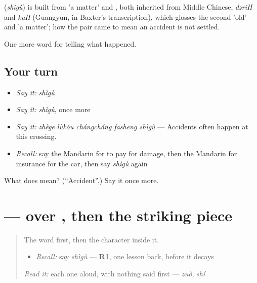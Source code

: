 \begin{cousinweb}
\textbf{} (\emph{shìgù}) is built from  'a matter' and , both inherited from Middle Chinese, \emph{dzriH} and \emph{kuH} (Guangyun, in Baxter's transcription), which glosses the second 'old' and 'a matter'; how the pair came to mean an accident is not settled.
\end{cousinweb}

\begin{grammarlens}[title={What you've built}]
One more word for telling what happened.
\end{grammarlens}

\subsection*{Your turn}
\begin{itemize}
\raggedright
  \item \emph{Say it:} \emph{shìgù}
  \item \emph{Say it:} \emph{shìgù}, once more
  \item \emph{Say it:} \emph{zhège lùkǒu chángcháng fāshēng shìgù} — Accidents often happen at this crossing.
  \item \emph{Recall:} say the Mandarin for to pay for damage, then the Mandarin for insurance for the car, then say \emph{shìgù} again
\end{itemize}

\begin{tcolorbox}[breakable,colback=teal!4,colframe=teal!35!black,title={Before you move on}]
What does  mean? (\textquotedblleft{}Accident\textquotedblright{}.) Say it once more.
\end{tcolorbox}
\section[\texorpdfstring{\zh{故} (gù)}{故 (gù)}]{ —  over , then the striking piece}

\label{lesson:ZH-W297-gu-old}



\begin{quote}
The word first, then the character inside it.

\begin{itemize}
\raggedright
  \item \emph{Recall:} say \emph{shìgù} — \textbf{R1}, one lesson back, before it decays
\end{itemize}

\begin{quote}
 
\end{quote}

\emph{Read it:} each one aloud, with nothing said first — \emph{zuò}, \emph{shí}
\end{quote}

